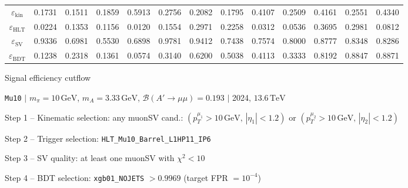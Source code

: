 \documentclass[10pt,a4paper]{article}
\begin{document}
\begin{landscape}
{\begin{tabular}{c|cccc|cccc|cccc}
\midrule
$\varepsilon_{\mathrm{kin}}$ & 0.1731 & 0.1511 & 0.1859 & 0.5913 & 0.2756 & 0.2082 & 0.1795 & 0.4107 & 0.2509 & 0.4161 & 0.2551 & 0.4340\\
$\varepsilon_{\mathrm{HLT}}$ & 0.0224 & 0.1353 & 0.1156 & 0.0120 & 0.1554 & 0.2971 & 0.2258 & 0.0312 & 0.0536 & 0.3695 & 0.2981 & 0.0812\\
$\varepsilon_{\mathrm{SV}}$ & 0.9336 & 0.6981 & 0.5530 & 0.6898 & 0.9781 & 0.9412 & 0.7438 & 0.7574 & 0.8000 & 0.8777 & 0.8348 & 0.8286\\
$\varepsilon_{\mathrm{BDT}}$ & 0.1238 & 0.2318 & 0.1361 & 0.0574 & 0.3140 & 0.6200 & 0.5038 & 0.4113 & 0.3333 & 0.8192 & 0.8847 & 0.8871\\
\bottomrule
\end{tabular}}

\end{landscape}
\clearpage

{\large Signal efficiency cutflow

 \texttt{Mu10} $|$ $m_{\pi}=10\,\mathrm{GeV}$, $m_{A}=3.33\,\mathrm{GeV}$, $\mathcal{B}(A'\!\to\!\mu\mu)=0.193$ $|$ 2024, $13.6\,\mathrm{TeV}$}

\vspace{0.8em}

Step 1 -- Kinematic selection: any muonSV cand.: $(p_T^{\mu_1}{>}10\,\mathrm{GeV},\,|\eta_1|{<}1.2)$ or $(p_T^{\mu_2}{>}10\,\mathrm{GeV},\,|\eta_2|{<}1.2)$

Step 2 -- Trigger selection: \texttt{HLT\_Mu10\_Barrel\_L1HP11\_IP6}

Step 3 -- SV quality: at least one muonSV with $\chi^2<10$

Step 4 -- BDT selection: \texttt{xgb01\_NOJETS} $>0.9969$ (target FPR $=10^{-4}$)

\vspace{0.8em}
\end{document}
